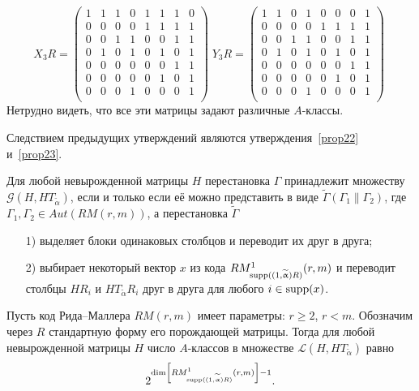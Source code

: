 $$
X_3R=
\begin{pmatrix}
1&1&1&0&1&1&1&0\\
0&0&0&0&1&1&1&1\\
0&0&1&1&0&0&1&1\\
0&1&0&1&0&1&0&1\\
0&0&0&0&0&0&1&1\\
0&0&0&0&0&1&0&1\\
0&0&0&1&0&0&0&1\\
\end{pmatrix}\;
Y_3R=
\begin{pmatrix}
1&1&0&1&0&0&0&1\\
0&0&0&0&1&1&1&1\\
0&0&1&1&0&0&1&1\\
0&1&0&1&0&1&0&1\\
0&0&0&0&0&0&1&1\\
0&0&0&0&0&1&0&1\\
0&0&0&1&0&0&0&1\\
\end{pmatrix}\;
$$
Нетрудно видеть, что все эти матрицы задают различные $A$-классы.

Следствием предыдущих утверждений являются
утверждения~\ref{prop22} и~\ref{prop23}.

\begin{proposition}\label{prop22}
Для любой невырожденной матрицы $H$ перестановка $\Gamma$
принадлежит множеству $\mathcal G(H,HT_{\widetilde\alpha})$, если
и только если её можно представить в виде
$\widetilde\Gamma(\Gamma_1\|\Gamma_2)$, где $\Gamma_1,\Gamma_2\in
Aut(RM(r,m))$, а перестановка $\widetilde\Gamma$
\begin{itemize}
\item[1)]выделяет блоки одинаковых столбцов и переводит их  друг в
друга;
\item[2)] выбирает некоторый вектор $x$ из кода
$RM^1_{\operatorname{supp}((1,\widetilde{\upalpha})R)}(r,m)$ и переводит столбцы
$HR_i$ и $HT_{\widetilde\alpha}R_i$ друг в друга для любого $i\in
\operatorname{supp}(x)$.
\end{itemize}
\end{proposition}

\begin{proposition}\label{prop23}
Пусть код Рида--Маллера $RM(r,m)$ имеет параметры: $r\geqslant 2$,
$r<m$. Обозначим через $R$ стандартную форму его порождающей
матрицы. Тогда для любой невырожденной матрицы $H$ число
$A$-классов в множестве $\mathcal L(H,HT_{\widetilde\alpha})$
равно
$$
2^{\dim \left[RM^1_{\operatorname{supp}((1,\widetilde {\upalpha})R)}(r,m)\right]-1}.
$$
\end{proposition}

